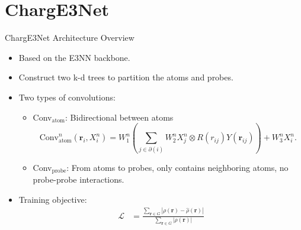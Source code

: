\section{ChargE3Net}


\begin{frame}{ChargE3Net Architecture Overview}
    \begin{itemize}
        \item Based on the E3NN backbone.
        \item Construct two k-d trees to partition the atoms and probes.
        \item Two types of convolutions:
        \begin{itemize}
            \item Conv$_{\text{atom}}$: Bidirectional between atoms
            \begin{equation*}
                \text{Conv}_{\text{atom}}^n(\mathbf{r}_i, X_i^n) = 
                W_1^n (\sum_{j \in \partial(i)}W_2^nX_j^n \otimes R(r_{ij})Y(\mathbf{r}_{ij}))
                + W_3^n X_i^{n}.
            \end{equation*}
            \item Conv$_{\text{probe}}$: From atoms to probes, only contains neighboring
            atoms, no probe-probe interactions.
        \end{itemize}
        \item Training objective:
        \begin{align*}
            \mathcal{L} &= \frac{\sum_{\mathbf{r} \in G} |\rho(\mathbf{r}) - \hat{\rho}(\mathbf{r})|}{
                \sum_{\mathbf{r} \in G} |\rho(\mathbf{r})|}
        \end{align*}
    \end{itemize}
\end{frame}


